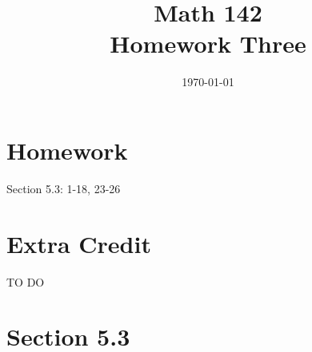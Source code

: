 \documentclass{exam}
\author{}
\date{\today}
\title{Math 142 \\ Homework Three}
\begin{document}
  \maketitle

  \section{Homework}
  Section 5.3: 1-18, 23-26

  \section{Extra Credit}
  TO DO

  \ifprintanswers
    \section{Section 5.3}
\end{document}
